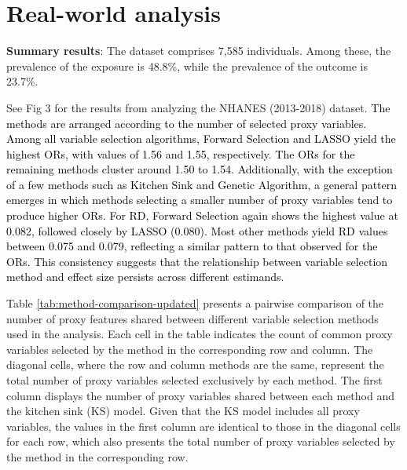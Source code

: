 \documentclass[10pt,letterpaper]{article}
\begin{document}
\section{Real-world analysis}\label{real-world-analysis}

\textbf{Summary results}: The dataset comprises 7,585 individuals. Among
these, the prevalence of the exposure is 48.8\%, while the prevalence of
the outcome is 23.7\%.

See Fig 3 for the results from analyzing
the NHANES (2013-2018) dataset.
\textcolor{black}{The methods are arranged according to the number of selected proxy variables. Among all variable selection algorithms, Forward Selection and LASSO yield the highest ORs, with values of 1.56 and 1.55, respectively. The ORs for the remaining methods cluster around 1.50 to 1.54. Additionally, with the exception of a few methods such as Kitchen Sink and Genetic Algorithm, a general pattern emerges in which methods selecting a smaller number of proxy variables tend to produce higher ORs. For RD, Forward Selection again shows the highest value at 0.082, followed closely by LASSO (0.080). Most other methods yield RD values between 0.075 and 0.079, reflecting a similar pattern to that observed for the ORs. This consistency suggests that the relationship between variable selection method and effect size persists across different estimands.}



Table \ref{tab:method-comparison-updated} presents a pairwise comparison
of the number of proxy features shared between different variable
selection methods used in the analysis. Each cell in the table indicates
the count of common proxy variables selected by the method in the
corresponding row and column. The diagonal cells, where the row and
column methods are the same, represent the total number of proxy
variables selected exclusively by each method. The first column displays
the number of proxy variables shared between each method and the kitchen
sink (KS) model. Given that the KS model includes all proxy variables,
the values in the first column are identical to those in the diagonal
cells for each row, which also presents the total number of proxy
variables selected by the method in the corresponding row.
\end{document}
